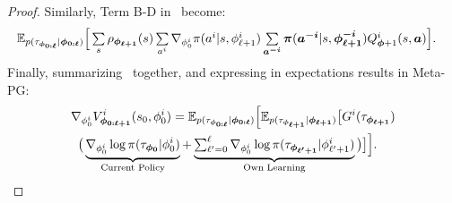 \begin{proof}
Similarly, Term B-D in~ become: 
\begin{align}\label{eqn:simple-theorem-step8}
\begin{split}
&
\mathbb{E}_{{p(\tau_{\bm{\phi}_{\bm{0:\ell}}}}|\bm{\phi}_{\bm{0:\ell}})}\Big[\textstyle\sum\limits_{s}\rho_{\bm{\phi}_{\bm{\ell+1}}}(s)\textstyle\sum\limits_{a^{i}}\nabla_{\phi^{i}_{0}}\pi(a^{i}|s,\phi^{i}_{\ell+1})\textstyle\sum\limits_{\bm{a}^{\bm{-i}}}\bm{\pi}(\bm{a}^{\bm{-i}}|s,\bm{\phi}^{\bm{-i}}_{\bm{\ell+1}})Q^{i}_{\bm{\phi}+1}(s,\bm{a})\Big].
\end{split}
\end{align}
Finally, summarizing~ together, and expressing in expectations results in Meta-PG:
\begin{align*}
\begin{split}
&\nabla_{\phi^{i}_{0}}V^{i}_{\bm{\phi}_{\bm{0:\ell+1}}}(s_0,\phi^{i}_{0})=\mathbb{E}_{p(\tau_{\bm{\phi}_{\bm{0:\ell}}}|\bm{\phi}_{\bm{0:\ell}})}\Big[\mathbb{E}_{p(\tau_{\bm{\phi}_{\bm{\ell+1}}}|\bm{\phi}_{\bm{\ell+1}})}\big[G^{i}(\tau_{\bm{\phi}_{\bm{\ell+1}}})\\
&\;\;\big(\underbrace{\nabla_{\phi^{i}_{0}}\log\pi(\tau_{\bm{\phi}_{\bm{0}}}|\phi^{i}_{0})}_{\text{Current Policy}}+\underbrace{\textstyle\sum\limits\nolimits_{\ell'=0}^{\ell}\nabla_{\phi^{i}_{0}}\log\pi(\tau_{\bm{\phi}_{\bm{\ell'+1}}}|\phi^{i}_{\ell'+1})}_{\text{Own Learning}}\big)\big]\Big].
\end{split}
\end{align*}
\end{proof}

